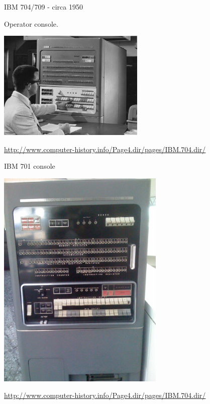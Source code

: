 \documentclass[professionalFonts]{beamer}
\begin{document}
\begin{frame}{IBM 704/709 - circa 1950}

Operator console.

\begin{center}
\includegraphics[width=7cm]{IBM704b.jpg}
\end{center}


{\small \url{http://www.computer-history.info/Page4.dir/pages/IBM.704.dir/}}

\end{frame}

% 
% 
% 
% 
% 


\begin{frame}{IBM 701 console}

\begin{center}
\includegraphics[width=8cm]{IBM_701console.jpg}
\end{center}


{\small \url{http://www.computer-history.info/Page4.dir/pages/IBM.704.dir/}}

\end{frame}
\end{document}
